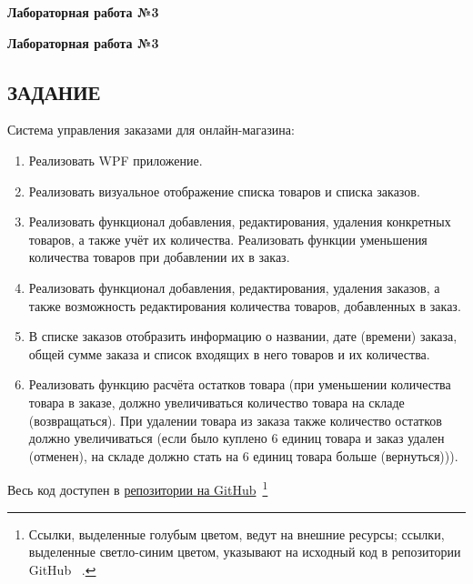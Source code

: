\documentclass[12pt]{article}
\newcommand{\lablogo}
{
\begin{center}
    \huge{\textbf{Лабораторная работа №3}} \\
\end{center}
}
\newcommand{\colorURL}[1]{\textcolor{CtpBlue}{#1}}
\newcommand{\colorGIT}[1]{\textcolor{CtpLavender}{#1}}
\renewcommand{\texttt}[1]{{\small\ttfamily #1}}
\numberwithin{listing}{section}
\numberwithin{figure}{section}
\begin{document}
\pagestyle{empty}

\lablogo

\tableofcontents
\newpage
\listoflistings

\newpage

\pagestyle{fancy}

\newpage

\lablogo

\begin{center}
	\section{ЗАДАНИЕ \ \texorpdfstring{\faScroll}{}}
\end{center}

\noindent Система управления заказами для онлайн-магазина:
\begin{enumerate}
	\item Реализовать \texttt{WPF} приложение.
	\item Реализовать визуальное отображение списка товаров и списка заказов.
	\item Реализовать функционал добавления, редактирования, удаления конкретных товаров, а также учёт их количества. Реализовать функции уменьшения количества товаров при добавлении их в заказ.
	\item Реализовать функционал добавления, редактирования, удаления заказов, а также возможность редактирования количества товаров, добавленных в заказ.
	\item В списке заказов отобразить информацию о названии, дате (времени) заказа, общей сумме заказа и список входящих в него товаров и их количества.
	\item Реализовать функцию расчёта остатков товара (при уменьшении количества товара в заказе, должно увеличиваться количество товара на складе (возвращаться). При удалении товара из заказа также количество остатков должно увеличиваться (если было куплено 6 единиц товара и заказ удален (отменен), на складе должно стать на 6 единиц товара больше (вернуться))).
\end{enumerate}
Весь код доступен в \colorURL{\href{https://github.com/WebMasterIT/Csharp_Labs/tree/main}{репозитории на GitHub}\ \faGithub}\footnote{Ссылки, выделенные \colorURL{голубым} цветом, ведут на внешние ресурсы; ссылки, выделенные \colorGIT{светло-синим} цветом, указывают на исходный код в репозитории GitHub \ \faGithub.}
\end{document}
